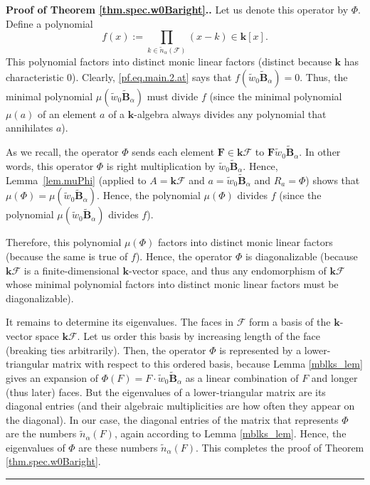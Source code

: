 \documentclass[12pt]{article}
\theoremstyle{definition}%
\theoremstyle{definition}%
\theoremstyle{remark}%
\newcommand{\tup}[1]{\left( #1 \right)}
\newcommand{\sbr}[1]{\left[ #1 \right]} %
\newcommand{\kk}{\mathbf{k}}
\newcommand{\kf}{\kk\mathcal{F}}
\newcommand{\BBta}{\widetilde{\mathbf{B}}_{\alpha}}
\newcommand{\FF}{\mathbf{F}}
\newcommand{\CF}{\mathcal{F}}
\newcommand{\wotil}{\widetilde{w}_0}
\newcommand{\nna}{\widetilde{n}_{ \alpha } }%
\newenvironment{proof}[1][Proof]{\noindent\textbf{#1.} }{\ \rule{0.5em}{0.5em}}
\begin{document}
\begin{proof}[Proof of Theorem \ref{thm.spec.w0Baright}.]
Let us denote this operator by $\Phi$. Define a polynomial
\[
f\tup{x}
:= \prod_{k \in \nna\tup{\CF}}\tup{x-k}
\in\kk\sbr{x} .
\]
This polynomial factors into distinct monic linear factors
(distinct because $\kk$ has characteristic $0$).
Clearly, \eqref{pf.eq.main.2.at} says that
$f\left( \wotil\BBta \right) =0$.
Thus, the minimal polynomial $\mu\tup{\wotil\BBta}$
must divide $f$ (since the minimal polynomial
$\mu\tup{a}$ of an element $a$ of a $\kk$-algebra always
divides any polynomial that annihilates $a$).

As we recall, the operator $\Phi$ sends each element
$\FF \in \kf$ to $\FF \wotil\BBta$.
In other words, this operator $\Phi$ is
right multiplication by $\wotil\BBta$.
Hence, Lemma~\ref{lem.muPhi} (applied to
$A = \kf$ and $a = \wotil\BBta$ and $R_a = \Phi$)
shows that
$\mu\tup{\Phi} = \mu\tup{\wotil\BBta}$.
Hence, the polynomial $\mu\tup{\Phi}$ divides $f$
(since the polynomial $\mu\tup{\wotil\BBta}$
divides $f$).

Therefore, this polynomial $\mu\tup{\Phi}$
factors into distinct monic linear factors
(because the same is true of $f$).
Hence, the operator
$\Phi$ is diagonalizable (because $\kf$ is a
finite-dimensional $\kk$-vector space, and thus
any endomorphism of $\kf$ whose minimal polynomial
factors into distinct monic linear factors must
be diagonalizable).

It remains to determine its eigenvalues.
The faces in $\CF$ form a basis of the
$\kk$-vector space $\kf$.
Let us order this basis by increasing length of
the face (breaking ties arbitrarily).
Then, the operator $\Phi$ is represented by a
lower-triangular matrix with respect to this
ordered basis,
because Lemma \ref{mblks_lem} gives an expansion of
$\Phi\tup{F} = F\cdot \wotil\BBta$ as a linear
combination of $F$ and longer (thus later) faces.
But the eigenvalues of a lower-triangular matrix are
its diagonal entries (and their algebraic
multiplicities are how often they appear on the diagonal).
In our case, the diagonal entries of the matrix
that represents $\Phi$ are the numbers
$\nna\tup{F}$, again according to Lemma
\ref{mblks_lem}. Hence, the eigenvalues of $\Phi$ are these
numbers $\nna\tup{F}$. This completes the
proof of Theorem \ref{thm.spec.w0Baright}.
\end{proof}
\end{document}

